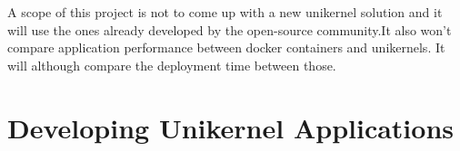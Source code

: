 A scope of this project is not to come up with a new unikernel solution and it will use the ones already developed by the open-source community.It also won't compare application performance between docker containers and unikernels. It will although compare the deployment time between those.
\fi
\section{Developing Unikernel Applications}


